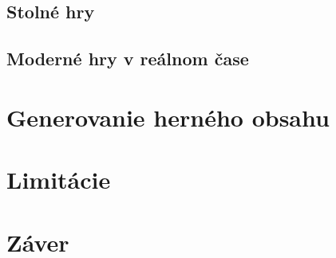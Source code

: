\documentclass{article}
\begin{document}
\subsection{Stolné hry}
\subsection{Moderné hry v reálnom čase}
\section{Generovanie herného obsahu}
\section{Limitácie}
\section{Záver}



\end{document}
